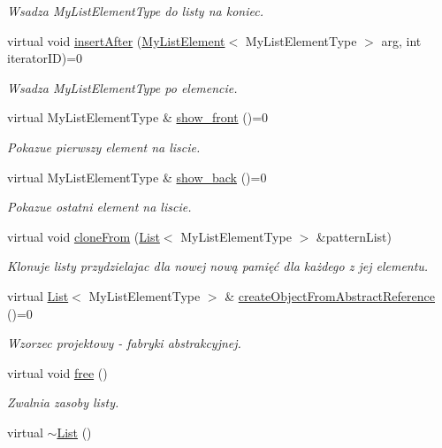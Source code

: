\begin{DoxyCompactItemize}
\begin{DoxyCompactList}\small\item\em Wsadza My\-List\-Element\-Type do listy na koniec. \end{DoxyCompactList}\item 
virtual void \hyperlink{class_list_a255ccc6785bf098a06f7a7f17aee134b}{insert\-After} (\hyperlink{class_my_list_element}{My\-List\-Element}$<$ My\-List\-Element\-Type $>$ arg, int iterator\-I\-D)=0
\begin{DoxyCompactList}\small\item\em Wsadza My\-List\-Element\-Type po elemencie. \end{DoxyCompactList}\item 
virtual My\-List\-Element\-Type \& \hyperlink{class_list_acbb16d4f43592aa83d8c02c1ffcf9c31}{show\-\_\-front} ()=0
\begin{DoxyCompactList}\small\item\em Pokazue pierwszy element na liscie. \end{DoxyCompactList}\item 
virtual My\-List\-Element\-Type \& \hyperlink{class_list_a5dc677b4022477232d48887dde6fb28f}{show\-\_\-back} ()=0
\begin{DoxyCompactList}\small\item\em Pokazue ostatni element na liscie. \end{DoxyCompactList}\item 
virtual void \hyperlink{class_list_a40a3d94c7f3aa49470625d47e6485570}{clone\-From} (\hyperlink{class_list}{List}$<$ My\-List\-Element\-Type $>$ \&pattern\-List)
\begin{DoxyCompactList}\small\item\em Klonuje listy przydzielajac dla nowej nową pamięć dla każdego z jej elementu. \end{DoxyCompactList}\item 
virtual \hyperlink{class_list}{List}$<$ My\-List\-Element\-Type $>$ \& \hyperlink{class_list_a37f6551e13258a321c806fffb7e2f068}{create\-Object\-From\-Abstract\-Reference} ()=0
\begin{DoxyCompactList}\small\item\em Wzorzec projektowy -\/ fabryki abstrakcyjnej. \end{DoxyCompactList}\item 
virtual void \hyperlink{class_list_a5406b275bb8650707a1d2bd38f661095}{free} ()
\begin{DoxyCompactList}\small\item\em Zwalnia zasoby listy. \end{DoxyCompactList}\item 
virtual \hyperlink{class_list_a94653beeb9216aab0f06665bfa5694ab}{$\sim$\-List} ()
\end{DoxyCompactItemize}


